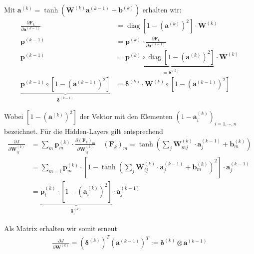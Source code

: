 \documentclass[a4paper, 12pt]{scrartcl}
\begin{document}
Mit $\bm{a}^{(k)} = \tanh(\bm{W}^{(k)}\bm{a}^{(k-1)} + \bm{b}^{(k)})$ erhalten wir:
%
\begin{align*}
    \frac{\partial \bm{F}_k}{\partial \bm{a}^{(k-1)}} 
    &=
    \operatorname{diag} \left[1- \left( \bm{a}^{(k)} \right)^2 \right] \cdot \bm{W}^{(k)}
    \\
    \bm{p}^{(k-1)} 
    &=
    \bm{p}^{(k)} 
    \cdot 
    \frac{\partial \bm{F}_k}{\partial \bm{a}^{(k-1)}} 
    \\
    \bm{p}^{(k-1)} 
    &= 
    \underbrace{
        \bm{p}^{(k)} 
        \circ 
        \operatorname{diag} \left[1- \left( \bm{a}^{(k)} \right)^2 \right]
    }_{
        := \bm{\delta}^{(k)}
    } 
    \cdot \bm{W}^{(k)}
        \\
    \underbrace{
        \bm{p}^{(k-1)} \circ \left[1- \left( \bm{a}^{(k-1)} \right)^2 \right]
    }_{
        \bm{\delta}^{(k-1)}
    }
    &=
    \bm{\delta}^{(k)} \cdot \bm{W}^{(k)} \circ \left[1- \left( \bm{a}^{(k-1)} \right)^2 \right]
\end{align*}


Wobei $\left[1- \left( \bm{a}^{(k)} \right)^2 \right]$ der Vektor 
mit den Elementen $(1-\bm{a}^{(k)}_i)_{i=1,\cdots , n}$ bezeichnet.
Für die Hidden-Layers gilt entsprechend
%
\begin{align*}
    \frac{\partial J}{\partial \bm{W}_{ij}^{(k)}}
    &=
    \sum_{m} \bm{p}_m^{(k)} \cdot 
    \frac{\partial (\bm{F}_k)_m}{\partial \bm{W}_{ij}^{(k)}}
    \quad
    (\bm{F}_k)_m = 
    \tanh
    \left(
        \sum_{j} \bm{W}_{mj}^{(k)} \cdot \bm{a}^{(k-1)}_j + \bm{b}^{(k)}_m
    \right)
    \\
    &=
    \sum_{m = i} \bm{p}_m^{(k)} \cdot 
    \left[
        1 - 
        \tanh
        \left(
            \sum_{j} \bm{W}_{ij}^{(k)} \cdot \bm{a}^{(k-1)}_j + \bm{b}^{(k)}_m
        \right)^2
    \right]
    \cdot 
    \bm{a}_j^{(k-1)}
    \\
    &=
    \underbrace{
        \bm{p}_i^{(k)} \cdot 
        \left[
            1 - 
            \left(
                \bm{a}_i^{(k)}
            \right)^2
        \right]
    }_{
        \bm{\delta}^{(k)}_i
    }
    \cdot 
    \bm{a}_j^{(k-1)}
\end{align*}

Als Matrix erhalten wir somit erneut 
%
\begin{align*}
     \frac{\partial J}{\partial \bm{W}^{(k)}} 
     = (\bm{\delta}^{(k)})^T (\bm{a}^{(k-1)})^T 
     := \bm{\delta}^{(k)} \otimes \bm{a}^{(k-1)}
\end{align*}
\end{document}
